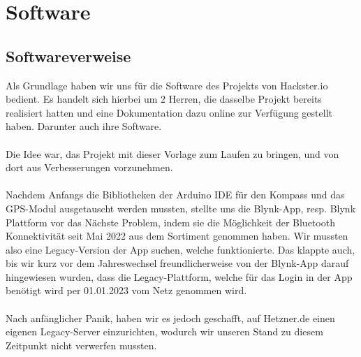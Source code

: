 \section{Software}

\subsection{Softwareverweise}
Als Grundlage haben wir uns für die Software des Projekts von Hackster.io bedient. Es handelt sich hierbei um 2 Herren, die dasselbe Projekt bereits realisiert hatten und eine Dokumentation dazu online zur Verfügung gestellt haben. Darunter auch ihre Software.\\
\\
Die Idee war, das Projekt mit dieser Vorlage zum Laufen zu bringen, und von dort aus Verbesserungen vorzunehmen. \\
\\
Nachdem Anfangs die Bibliotheken der Arduino IDE für den Kompass und das GPS-Modul ausgetauscht werden mussten, stellte uns die Blynk-App, resp. Blynk Plattform vor das Nächste Problem, indem sie die Möglichkeit der Bluetooth Konnektivität seit Mai 2022 aus dem Sortiment genommen haben. Wir mussten also eine Legacy-Version der App suchen, welche funktionierte. Das klappte auch, bis wir kurz vor dem Jahreswechsel freundlicherweise von der Blynk-App darauf hingewiesen wurden, dass die Legacy-Plattform, welche für das Login in der App benötigt wird per 01.01.2023 vom Netz genommen wird.\\
\\
Nach anfänglicher Panik, haben wir es jedoch geschafft, auf Hetzner.de einen eigenen Legacy-Server einzurichten, wodurch wir unseren Stand zu diesem Zeitpunkt nicht verwerfen mussten. 
